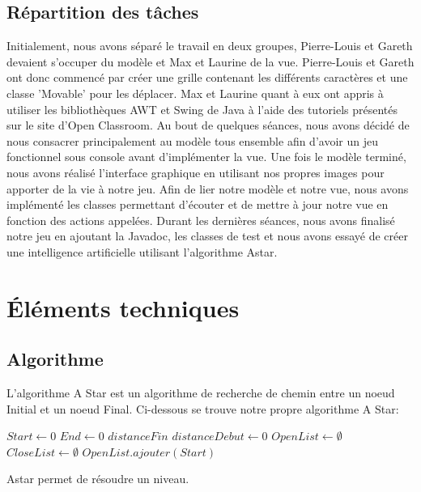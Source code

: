 \documentclass[a4paper,12pt]{article} %
\begin{document}
\subsection{Répartition des tâches}
Initialement, nous avons séparé le travail en deux groupes, Pierre-Louis et Gareth devaient s'occuper du modèle et Max et Laurine de la vue. Pierre-Louis et Gareth ont donc commencé par créer une grille contenant les différents caractères et une classe 'Movable' pour les déplacer. Max et Laurine quant à eux ont appris à utiliser les bibliothèques AWT et Swing de Java à l'aide des tutoriels présentés sur le site d'Open Classroom. Au bout de quelques séances, nous avons décidé de nous consacrer principalement au modèle tous ensemble afin d'avoir un jeu fonctionnel sous console avant d'implémenter la vue. Une fois le modèle terminé, nous avons réalisé l'interface graphique en utilisant nos propres images pour apporter de la vie à notre jeu. Afin de lier notre modèle et notre vue, nous avons implémenté les classes permettant d'écouter et de mettre à jour notre vue en fonction des actions appelées.  Durant les dernières séances, nous avons finalisé notre jeu en ajoutant la Javadoc, les classes de test et nous avons essayé de créer une intelligence artificielle utilisant l'algorithme Astar.
\section{Éléments techniques}

\subsection{Algorithme}

L'algorithme A Star est un algorithme de recherche de chemin entre un noeud Initial et un noeud Final. Ci-dessous se trouve notre propre algorithme A Star:

\begin{algorithm}
\DontPrintSemicolon
{}
$Start \gets 0$\;
$End \gets 0$\;
$distanceFin$\;
$distanceDebut \gets 0$\;
$OpenList \gets \emptyset$\;
$CloseList \gets \emptyset$\;
$OpenList.ajouter(Start)$\;
\;
\caption{{\sc Astar} permet de résoudre un niveau.}
\label{algo:max}
\end{algorithm}
\end{document}
